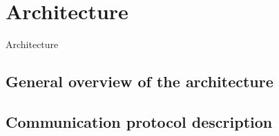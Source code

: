 \chapter{Architecture}
\label{Architecture}

Architecture
\section{General overview of the architecture}
\section{Communication protocol description}